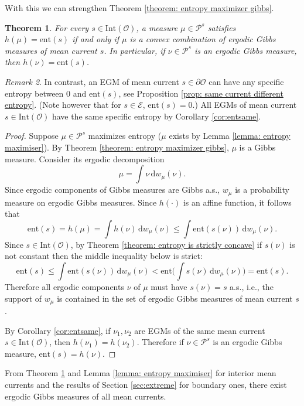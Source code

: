 \documentclass[11pt]{article}
\newtheorem{thm}{Theorem}[subsection]
\theoremstyle{remark}
\newtheorem{rem}[thm]{Remark}
\theoremstyle{definition}
\newcommand{\ent}{\text{ent}}
\newcommand{\mc}[1]{\mathcal{#1}}
\newcommand{\dd}{\mathrm{d}}
\begin{document}
With this we can strengthen Theorem \ref{theorem: entropy maximizer gibbs}. 

\begin{thm}\label{theorem: existence of gibbs}
	For every $s\in \text{Int}(\mathcal O)$, a measure $\mu\in \mathcal P^{s}$ satisfies $h(\mu) = \ent(s)$ if and only if $\mu$ is a convex combination of ergodic Gibbs measures of mean current $s$. In particular, if $\nu\in \mc P^s$ is an ergodic Gibbs measure, then $h(\nu) = \ent(s)$.
\end{thm}
\begin{rem}
    In contrast, an EGM of mean current $s\in \partial \mc O$ can have any specific entropy between $0$ and $\ent(s)$, see Proposition \ref{prop: same current different entropy}. (Note however that for $s\in \mc E$, $\ent(s) = 0$.) All EGMs of mean current $s\in \text{Int}(\mc O)$ have the same specific entropy by Corollary \ref{cor:entsame}.
\end{rem}
\begin{proof}
Suppose $\mu\in \mathcal P^{s}$ maximizes entropy ($\mu$ exists by Lemma \ref{lemma: entropy maximiser}). By Theorem \ref{theorem: entropy maximizer gibbs}, $\mu$ is a Gibbs measure. Consider its ergodic decomposition
$$\mu=\int \nu \, \dd w_\mu(\nu).$$
Since ergodic components of Gibbs measures are Gibbs a.s., $w_\mu$ is a probability measure on ergodic Gibbs measures. Since $h(\cdot)$ is an affine function, it follows that
$$\ent(s) = h({\mu})=\int h({\nu})\,\dd w_\mu(\nu)\leq \int \ent({s(\nu)})\,\dd w_\mu(\nu).$$
Since $s\in \text{Int}(\mc O)$, by Theorem \ref{theorem: entropy is strictly concave} if $s(\nu)$ is not constant then the middle inequality below is strict:
$$ \ent( s) \leq \int \ent(s (\nu)) \, \dd w_\mu(\nu) < \ent \bigg( \int s (\nu) \, \dd w_\mu(\nu) \bigg) = \ent(s).$$ 
Therefore all ergodic components $\nu$ of $\mu$ must have $s(\nu) = s$ a.s., i.e., the support of $w_\mu$ is contained in the set of ergodic Gibbs measures of mean current $s$. 

By Corollary \ref{cor:entsame}, if $\nu_1,\nu_2$ are EGMs of the same mean current $s\in \text{Int}(\mc O)$, then $h(\nu_1)= h(\nu_2)$. Therefore if $\nu\in \mc P^s$ is an ergodic Gibbs measure, $\ent(s) = h(\nu)$. 
\end{proof}
 
From Theorem \ref{theorem: existence of gibbs} and Lemma \ref{lemma: entropy maximiser} for interior mean currents and the results of Section \ref{sec:extreme} for boundary ones, there exist ergodic Gibbs measures of all mean currents. 
\end{document}

